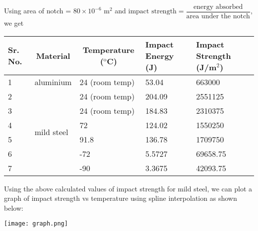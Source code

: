 \documentclass[a4paper, 11pt]{article}
\begin{document}
Using area of notch = $80\times 10^{-6}\text{ m}^2$ and $\text{impact strength}=\dfrac{\text{energy absorbed}}{\text{area under the notch}}$, we get
\begin{center}
\def\arraystretch{1.5}
\begin{tabular}{|l|l|l|l|l|}
\hline
\textbf{Sr. No.} & \multicolumn{1}{c|}{\textbf{Material}} & \multicolumn{1}{c|}{\textbf{Temperature ($^{\text{o}}$C)}} & \textbf{Impact Energy (J)} & \textbf{Impact Strength (J/m$^2$)} \\ \hline
1                & aluminium                              & 24 (room temp)                                & 53.04                      & 663000                         \\ \hline
2                & \multirow{6}{*}{mild steel}            & 24 (room temp)                                & 204.09                     & 2551125                        \\ \cline{1-1} \cline{3-5} 
3                &                                        & 24 (room temp)                                & 184.83                     & 2310375                        \\ \cline{1-1} \cline{3-5} 
4                &                                        & 72                                            & 124.02                     & 1550250                        \\ \cline{1-1} \cline{3-5} 
5                &                                        & 91.8                                          & 136.78                     & 1709750                        \\ \cline{1-1} \cline{3-5} 
6                &                                        & -72                                           & 5.5727                     & 69658.75                       \\ \cline{1-1} \cline{3-5} 
7                &                                        & -90                                           & 3.3675                     & 42093.75                       \\ \hline
\end{tabular}
\end{center}
\newpage
Using the above calculated values of impact strength for mild steel, we can plot a graph of impact strength vs temperature using spline interpolation as shown below:

\begin{center}
\texttt{[image: graph.png]}
\end{center}
\end{document}
